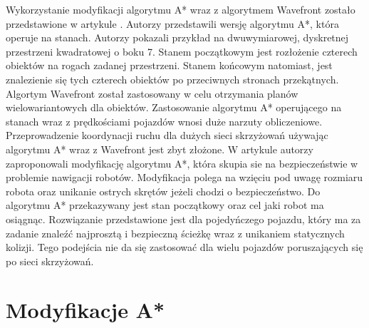 \newline
\indent
Wykorzystanie modyfikacji algorytmu A* wraz z algorytmem Wavefront zostało przedstawione w artykule \cite{wojnicki2015robust}. Autorzy przedstawili wersję algorytmu A*, która operuje na stanach. Autorzy pokazali przykład na dwuwymiarowej, dyskretnej przestrzeni kwadratowej o boku 7. Stanem początkowym jest rozłożenie czterech obiektów na rogach zadanej przestrzeni. Stanem końcowym natomiast, jest znalezienie się tych czterech obiektów po przeciwnych stronach przekątnych. Algortym Wavefront został zastosowany w celu otrzymania planów wielowariantowych dla obiektów. Zastosowanie algorytmu A* operującego na stanach wraz z prędkościami pojazdów wnosi duże narzuty obliczeniowe. Przeprowadzenie koordynacji ruchu dla dużych sieci skrzyżowań używając algorytmu A* wraz z Wavefront jest zbyt złożone.
\newline
\indent
W artykule \cite{elhalawany2013modified} autorzy zaproponowali modyfikację algorytmu A*, która skupia sie na bezpieczeństwie w problemie nawigacji robotów. Modyfikacja polega na wzięciu pod uwagę rozmiaru robota oraz unikanie ostrych skrętów jeżeli chodzi o bezpieczeństwo. Do algorytmu A* przekazywany jest stan początkowy oraz cel jaki robot ma osiągnąc. Rozwiązanie przedstawione jest dla pojedyńczego pojazdu, który ma za zadanie znaleźć najprosztą i bezpieczną ścieżkę wraz z unikaniem statycznych kolizji. Tego podejścia nie da się zastosować dla wielu pojazdów poruszających się po sieci skrzyżowań.

\section{Modyfikacje A*}

